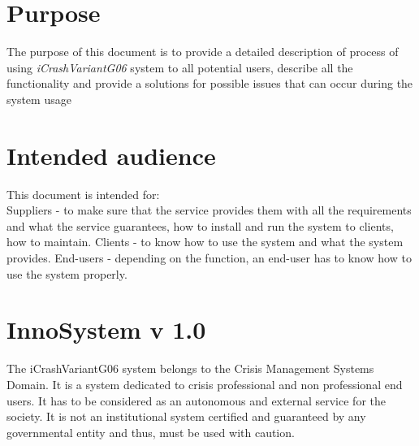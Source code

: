 
 


\section{Purpose}
The purpose of this document is to provide a detailed description of process of
using {\emph{iCrashVariantG06}} system to all potential users, describe all the
functionality and provide a solutions for possible issues that can occur during the system usage


\section{Intended audience}

This document is intended for:\\
Suppliers - to make sure that the service provides them with all the
requirements and what the service guarantees, how to install and run the system to clients,
how to maintain. 
Clients  - to know how to use the system and what the system provides. 
End-users - depending on the function, an end-user has to know how to use the
system properly.


\section{InnoSystem v 1.0}
The iCrashVariantG06 system belongs to the Crisis Management Systems Domain. It is a
system dedicated to crisis professional and non professional end users. It has
to be considered as an autonomous and external service for the society. It is not an institutional system certified and guaranteed by any governmental entity and thus, must be used with caution.\\


